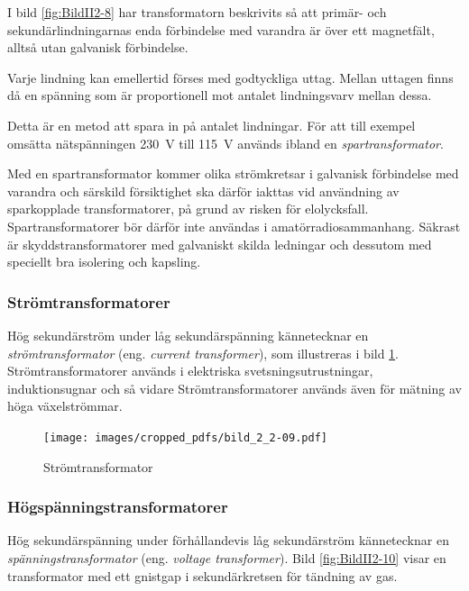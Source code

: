 I bild \ref{fig:BildII2-8} har transformatorn beskrivits så att primär- och
sekundärlindningarnas enda förbindelse med varandra är över ett magnetfält,
alltså utan galvanisk förbindelse.

Varje lindning kan emellertid förses med godtyckliga uttag. Mellan uttagen finns 
då en spänning som är proportionell mot antalet lindningsvarv mellan dessa.

Detta är en metod att spara in på antalet lindningar. För att till exempel omsätta
nätspänningen 230~V till 115~V används ibland en \emph{spartransformator}.

Med en spartransformator kommer olika strömkretsar i galvanisk förbindelse med
varandra och särskild försiktighet ska därför iakttas vid användning av
sparkopplade transformatorer, på grund av risken för elolycksfall.
Spartransformatorer bör därför inte användas i amatörradiosammanhang. Säkrast
är skyddstransformatorer med galvaniskt skilda ledningar och dessutom med speciellt
bra isolering och kapsling.

\subsubsection{Strömtransformatorer}

Hög sekundärström under låg sekundärspänning kännetecknar en
\emph{strömtransformator} (eng. \emph{current transformer}),
som illustreras i bild \ref{fig:BildII2-9}.
Strömtransformatorer används i elektriska svetsningsutrustningar,
induktionsugnar och så vidare Strömtransformatorer används även för mätning av höga
växelströmmar.

\begin{figure}[ht]
\begin{center}
\texttt{[image: images/cropped\_pdfs/bild\_2\_2-09.pdf]}
\caption{Strömtransformator}
\label{fig:BildII2-9}
\end{center}
\end{figure}

\subsubsection{Högspänningstransformatorer}

Hög sekundärspänning under förhållandevis låg sekundärström kännetecknar en
\emph{spänningstransformator} (eng. \emph{voltage transformer}).
Bild \ref{fig:BildII2-10} visar en transformator med ett gnistgap i
sekundärkretsen för tändning av gas.

